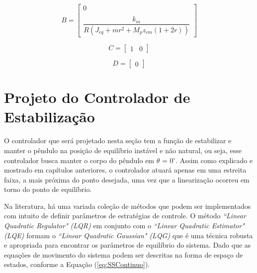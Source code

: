 \begin{equation*}
B = \begin{bmatrix}
        0 \\\\
        \dfrac{k_{m}}{R(J_{eq} + mr^2 + M_{p}z_{cm}(1 + 2r))}
    \end{bmatrix}
\end{equation*}

\begin{equation*}
C = \begin{bmatrix}
        1 & 0
    \end{bmatrix}
\end{equation*}

\begin{equation*}
D = \begin{bmatrix}
        0
    \end{bmatrix}
\end{equation*}

\section{Projeto do Controlador de Estabilização}

O controlador que será projetado nesta seção tem a função de estabilizar e manter o pêndulo na posição de equilíbrio instável e não natural, ou seja, esse controlador busca manter o corpo do pêndulo em $\theta$ = 0$^\circ$. Assim como explicado e mostrado em capítulos anteriores, o controlador atuará apenas em uma estreita faixa, a mais próxima do ponto desejada, uma vez que a linearização ocorreu em torno do ponto de equilíbrio.

Na literatura, há uma variada coleção de métodos que podem ser implementados com intuito de definir parâmetros de estratégias de controle. O método \textit{``Linear Quadratic Regulator" (LQR)} em conjunto com o \textit{``Linear Quadratic Estimator" (LQE)} formam o \textit{``Linear Quadratic Gaussian" (LQG)} que é uma técnica robusta e apropriada para encontrar os parâmetros de equilíbrio do sistema. Dado que as equações de movimento do sistema podem ser descritas na forma de espaço de estados, conforme a Equação (\ref{eq:SSContinuo}).

